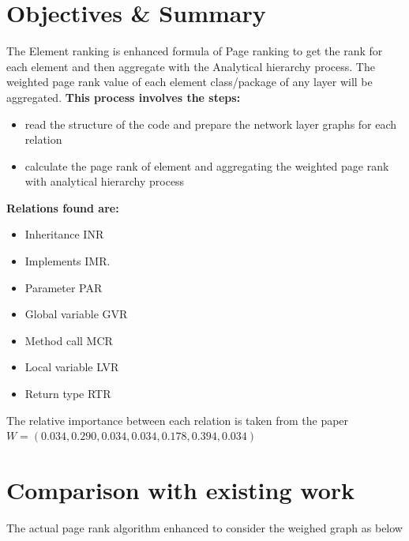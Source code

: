 \documentclass{article}
\begin{document}
\section{Objectives \& Summary}
\label{sec:objectives}
The Element ranking is enhanced formula of Page ranking to get the rank for each element and then aggregate with the Analytical hierarchy process. The weighted page rank value of each element class/package of any layer will be aggregated. 
\textbf{This process involves the steps:}

\begin{itemize}
    \item read the structure of the code and prepare the network layer graphs for each relation
    \item calculate the page rank of element and aggregating the weighted page rank with analytical hierarchy process
\end{itemize}

\textbf{Relations found are:}
\begin{itemize}
    \item Inheritance INR
    \item Implements IMR.
    \item Parameter PAR
    \item Global variable GVR
    \item Method call MCR
    \item Local variable LVR
    \item Return type RTR
\end{itemize}

The relative importance between each relation is taken from the paper $W = (0.034, 0.290, 0.034, 0.034, 0.178, 0.394, 0.034)$

\newpage

\section{Comparison with existing work}
\label{sec:comWork}
The actual page rank algorithm enhanced to consider the weighed graph as below
\end{document}
